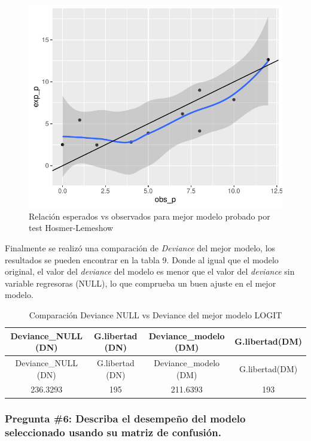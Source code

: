 \documentclass[
]{article}
\begin{document}
\begin{figure}
\centering
\includegraphics{taller4_regresionlogist_files/figure-latex/gráfica de relación de esperados y observados MEJOR MODELO Hosmer-lemeshow-1.pdf}
\caption{Relación esperados vs observados para mejor modelo probado por
test Hosmer-Lemeshow}
\end{figure}

Finalmente se realizó una comparación de \emph{Deviance} del mejor
modelo, los resultados se pueden encontrar en la tabla 9. Donde al igual
que el modelo original, el valor del \emph{deviance} del modelo es menor
que el valor del \emph{deviance} sin variable regresoras (NULL), lo que
comprueba un buen ajuste en el mejor modelo.

\begin{longtable}[]{@{}cccc@{}}
\caption{Comparación Deviance NULL vs Deviance del mejor modelo
LOGIT}\tabularnewline
\toprule
Deviance\_NULL (DN) & G.libertad (DN) & Deviance\_modelo (DM) &
G.libertad(DM)\tabularnewline
\midrule
\endfirsthead
\toprule
Deviance\_NULL (DN) & G.libertad (DN) & Deviance\_modelo (DM) &
G.libertad(DM)\tabularnewline
\midrule
\endhead
236.3293 & 195 & 211.6393 & 193\tabularnewline
\bottomrule
\end{longtable}

\hypertarget{pregunta-6-describa-el-desempeuxf1o-del-modelo-seleccionado-usando-su-matriz-de-confusiuxf3n.}{%
\subsubsection{Pregunta \#6: Describa el desempeño del modelo
seleccionado usando su matriz de
confusión.}\label{pregunta-6-describa-el-desempeuxf1o-del-modelo-seleccionado-usando-su-matriz-de-confusiuxf3n.}}
\end{document}
